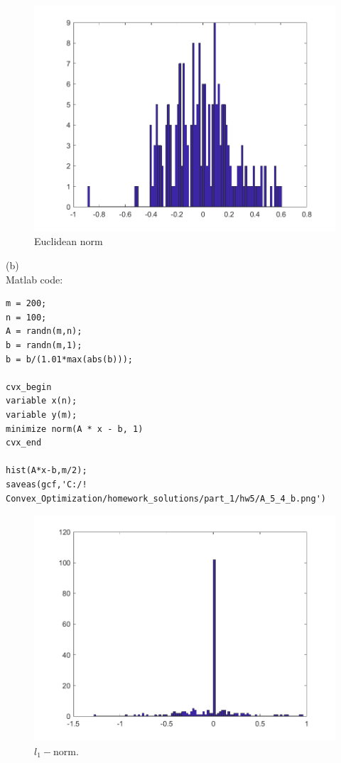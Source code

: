 \documentclass{article}
\begin{document}
\begin{figure}[H]
	\includegraphics[width=\linewidth]{A_5_4_a.png}
	\caption{Euclidean norm}
\end{figure}

(b)\\
Matlab code:

\begin{verbatim}
m = 200;
n = 100;
A = randn(m,n);
b = randn(m,1);
b = b/(1.01*max(abs(b)));

cvx_begin
variable x(n);
variable y(m);
minimize norm(A * x - b, 1)
cvx_end

hist(A*x-b,m/2);
saveas(gcf,'C:/! Convex_Optimization/homework_solutions/part_1/hw5/A_5_4_b.png')
\end{verbatim}

\begin{figure}[H]
	\includegraphics[width=\linewidth]{A_5_4_b.png}
	\caption{$l_1-$norm.}
\end{figure}
\end{document}
